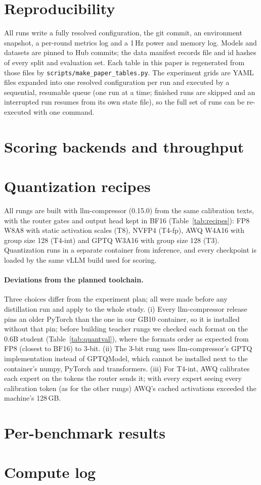 \section{Reproducibility}\label{app:repro}
All runs write a fully resolved configuration, the git commit, an environment snapshot, a
per-round metrics log and a 1\,Hz power and memory log. Models and datasets are pinned to Hub
commits; the data manifest records file and id hashes of every split and evaluation set. Each
table in this paper is regenerated from those files by \texttt{scripts/make\_paper\_tables.py}.
The experiment grids are YAML files expanded into one resolved configuration per run and executed
by a sequential, resumable queue (one run at a time; finished runs are skipped and an interrupted
run resumes from its own state file), so the full set of runs can be re-executed with one command.

\section{Scoring backends and throughput}\label{app:backends}



\section{Quantization recipes}\label{app:quant}
All rungs are built with llm-compressor (0.15.0) from the same \calibN{} calibration texts, with
the router gates and output head kept in BF16 (Table~\ref{tab:recipes}): FP8 W8A8 with static
activation scales (T8), NVFP4 (T4-fp), AWQ W4A16 with group size 128 (T4-int) and GPTQ W3A16 with
group size 128 (T3). Quantization runs in a separate container from inference, and every
checkpoint is loaded by the same vLLM build used for scoring.

\paragraph{Deviations from the planned toolchain.} Three choices differ from the experiment plan;
all were made before any distillation run and apply to the whole study.
(i) Every llm-compressor release pins an older PyTorch than the one in our GB10 container, so it
is installed without that pin; before building teacher rungs we checked each format on the 0.6B
student (Table~\ref{tab:quantval}), where the formats order as expected from FP8 (closest to
BF16) to 3-bit. (ii) The 3-bit rung uses llm-compressor's GPTQ implementation instead of GPTQModel,
which cannot be installed next to the container's numpy, PyTorch and transformers. (iii) For
T4-int, AWQ calibrates each expert on the tokens the router sends it; with every expert seeing
every calibration token (as for the other rungs) AWQ's cached activations exceeded the machine's
128\,GB.




\section{Per-benchmark results}\label{app:perbench}
\TBD{}

\section{Compute log}\label{app:compute}
\TBD{} 
